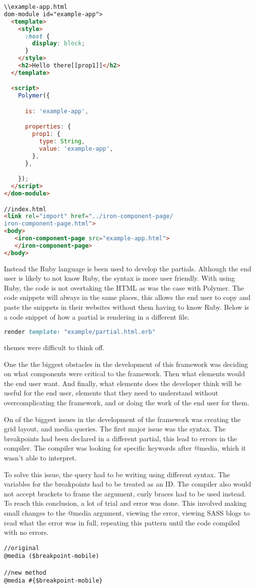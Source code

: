 \begin{lstlisting}[language=HTML]
\\example-app.html
dom-module id="example-app">
  <template>
    <style>
      :host {
        display: block;
      }
    </style>
    <h2>Hello there[[prop1]]</h2>
  </template>

  <script>
    Polymer({

      is: 'example-app',

      properties: {
        prop1: {
          type: String,
          value: 'example-app',
        },
      },

    });
  </script>
</dom-module>

//index.html
<link rel="import" href="../iron-component-page/
iron-component-page.html">
<body>
   <iron-component-page src="example-app.html">
   </iron-component-page>
</body>
\end{lstlisting}

Instead the Ruby language is been used to develop the partials. Although the end user is likely to not know Ruby, the syntax is more user friendly. With using Ruby, the code is not overtaking the HTML as was the case with Polymer. The code snippets will always in the same places, this allows the end user to copy and paste the snippets in their websites without them having to know Ruby. Below is a code snippet of how a partial is rendering in a different file. 

\begin{lstlisting}[language=Ruby]
render template: "example/partial.html.erb"
\end{lstlisting}


themes were difficult to think off. 

One the the biggest obstacles in the development of this framework was deciding on what components were critical to the framework. Then what elements would the end user want. And finally, what elements does the developer think will be useful for the end user, elements that they need to understand without overcomplicating the framework, and or doing the work of the end user for them.

On of the biggest issues in the development of the framework was creating the grid layout, and media queries. The first major issue was the syntax. The breakpoints had been declared in a different partial, this lead to errors in the compiler. The compiler was looking for specific keywords after @media, which it wasn't able to interpret.

To solve this issue, the query had to be writing using different syntax. The variables for the breakpoints had to be treated as an ID. The compiler also would not accept brackets to frame the argument, curly braces had to be used instead. To reach this conclusion, a lot of trial and error was done. This involved making small changes to the @media argument, viewing  the error, viewing \gls{SASS} blogs to read what the error was in full, repeating this pattern until the code compiled with no errors. 
\begin{lstlisting}[language=CSS3]
//original 
@media ($breakpoint-mobile)

//new method
@media #{$breakpoint-mobile} 
\end{lstlisting}

